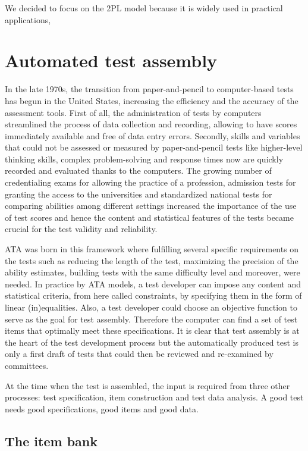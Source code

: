 We decided to focus on the 2PL model because it is widely used in practical applications, \textcite{desimone2015item}

\section{Automated test assembly}\label{sec:ata}

In the late 1970s, the transition from paper-and-pencil to computer-based tests has begun in the United States, increasing the efficiency and the accuracy of the assessment tools. First of all, the administration of tests by computers streamlined the process of data collection and recording, allowing to have scores immediately available
and free of data entry errors. Secondly, skills and variables that could not be assessed or measured by paper-and-pencil tests like higher-level thinking skills, complex problem-solving and response times now are quickly recorded and evaluated thanks to the computers. The growing number of credentialing exams for allowing the practice of a profession, admission tests for granting the access to the universities and standardized national tests for comparing abilities among different settings increased the importance of the use of test scores and hence the content and statistical features of the tests became crucial for the test validity and reliability.

ATA was born in this framework where fulfilling several specific requirements on the tests such as reducing the length of the test, maximizing the precision of the ability estimates, building tests with the same difficulty level and moreover, were needed. In practice by ATA models, a test developer can impose any content and statistical criteria, from here called constraints, by specifying them in the form of linear (in)equalities. Also, a test developer could choose an objective function to serve as the goal for test assembly. Therefore the computer can find a set of test items that optimally meet these specifications. It is clear that test assembly is at the heart of the test development process but the automatically produced test is only a first draft of tests that could then be reviewed and re-examined by committees.

At the time when the test is assembled, the input is required from
three other processes: test specification, item construction and test data
analysis. A good test needs good specifications, good items and good data.

\subsection{The item bank}\label{sec:the-item-bank}

